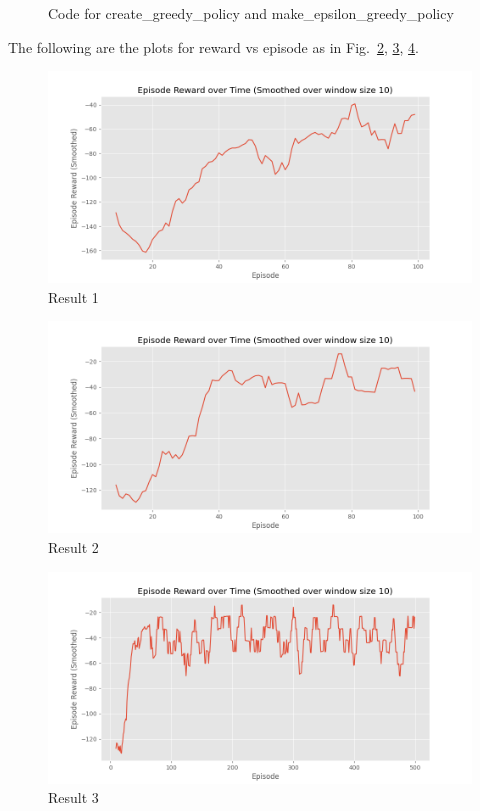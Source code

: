 \documentclass[a4paper]{article}
\theoremstyle{definition}
\newenvironment{soln}{
    \leavevmode\color{blue}\ignorespaces
}{}
\begin{document}
\begin{soln}
\begin{figure}[H]
        \caption{Code for create\_greedy\_policy and make\_epsilon\_greedy\_policy}
        \label{fig:q32}
    \end{figure}
    The following are the plots for reward vs episode as in Fig.~\ref{fig:q3a}, \ref{fig:q3b}, \ref{fig:q3c}.
    \begin{figure}[H]
        \centering
        \includegraphics[width=0.8\linewidth]{3_1.png}
        \caption{Result 1}
        \label{fig:q3a}
    \end{figure}
    \begin{figure}[H]
        \centering
        \includegraphics[width=0.8\linewidth]{3_2.png}
        \caption{Result 2}
        \label{fig:q3b}
    \end{figure}
    \begin{figure}[H]
        \centering
        \includegraphics[width=0.8\linewidth]{3_3.png}
        \caption{Result 3}
        \label{fig:q3c}
    \end{figure}
\end{soln}
\end{document}
